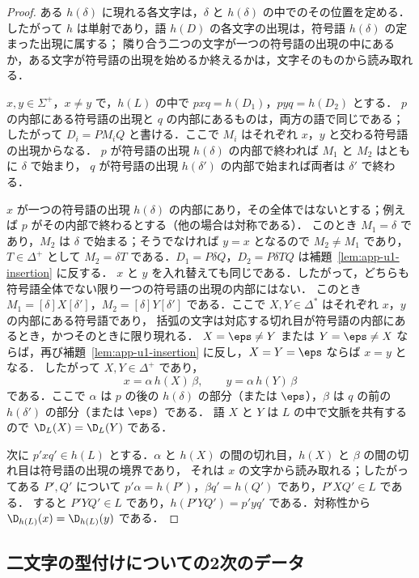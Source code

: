 \begin{proof}
ある $h(\delta)$ に現れる各文字は，$\delta$ と $h(\delta)$ の中でのその位置を定める．
したがって $h$ は単射であり，語 $h(D)$ の各文字の出現は，符号語 $h(\delta)$ の定まった出現に属する；
隣り合う二つの文字が一つの符号語の出現の中にあるか，ある文字が符号語の出現を始めるか終えるかは，文字そのものから読み取れる．

$x,y\in\Sigma^+$，$x\ne y$ で，$h(L)$ の中で $pxq=h(D_1)$，$pyq=h(D_2)$ とする．
$p$ の内部にある符号語の出現と $q$ の内部にあるものは，両方の語で同じである；
したがって $D_i=PM_iQ$ と書ける．ここで $M_i$ はそれぞれ $x$，$y$ と交わる符号語の出現からなる．
$p$ が符号語の出現 $h(\delta)$ の内部で終われば $M_1$ と $M_2$ はともに $\delta$ で始まり，
$q$ が符号語の出現 $h(\delta')$ の内部で始まれば両者は $\delta'$ で終わる．

$x$ が一つの符号語の出現 $h(\delta)$ の内部にあり，その全体ではないとする；例えば $p$ がその内部で終わるとする（他の場合は対称である）．
このとき $M_1=\delta$ であり，$M_2$ は $\delta$ で始まる；そうでなければ $y=x$ となるので $M_2\ne M_1$ であり，
$T\in\Delta^+$ として $M_2=\delta T$ である．$D_1=P\delta Q$，$D_2=P\delta TQ$ は補題~\ref{lem:app-u1-insertion} に反する．
$x$ と $y$ を入れ替えても同じである．したがって，どちらも符号語全体でない限り一つの符号語の出現の内部にはない．
このとき $M_1=[\delta]X[\delta']$，$M_2=[\delta]Y[\delta']$ である．ここで $X,Y\in\Delta^*$ はそれぞれ $x$，$y$ の内部にある符号語であり，
括弧の文字は対応する切れ目が符号語の内部にあるとき，かつそのときに限り現れる．
$X=\eps\ne Y$ または $Y=\eps\ne X$ ならば，再び補題~\ref{lem:app-u1-insertion} に反し，$X=Y=\eps$ ならば $x=y$ となる．
したがって $X,Y\in\Delta^+$ であり，
\[
 x=\alpha\,h(X)\,\beta,\qquad y=\alpha\,h(Y)\,\beta
\]
である．ここで $\alpha$ は $p$ の後の $h(\delta)$ の部分（または $\eps$），$\beta$ は $q$ の前の $h(\delta')$ の部分（または $\eps$）である．
語 $X$ と $Y$ は $L$ の中で文脈を共有するので $\D_L(X)=\D_L(Y)$ である．

次に $p'xq'\in h(L)$ とする．$\alpha$ と $h(X)$ の間の切れ目，$h(X)$ と $\beta$ の間の切れ目は符号語の出現の境界であり，
それは $x$ の文字から読み取れる；したがってある $P',Q'$ について $p'\alpha=h(P')$，$\beta q'=h(Q')$ であり，$P'XQ'\in L$ である．
すると $P'YQ'\in L$ であり，$h(P'YQ')=p'yq'$ である．対称性から $\D_{h(L)}(x)=\D_{h(L)}(y)$ である．
\end{proof}


\subsection{二文字の型付けについての2次のデータ}

